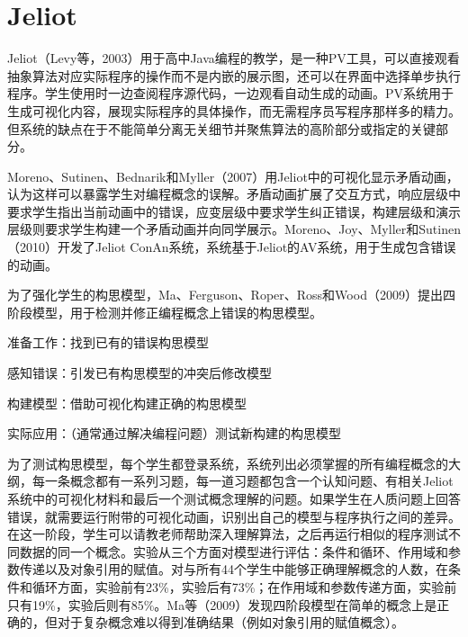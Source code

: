 \section{Jeliot}
\begin{sectext}
Jeliot（Levy等，2003）用于高中Java编程的教学，是一种PV工具，可以直接观看抽象算法对应实际程序的操作而不是内嵌的展示图，还可以在界面中选择单步执行程序。学生使用时一边查阅程序源代码，一边观看自动生成的动画。PV系统用于生成可视化内容，展现实际程序的具体操作，而无需程序员写程序那样多的精力。但系统的缺点在于不能简单分离无关细节并聚焦算法的高阶部分或指定的关键部分。

Moreno、Sutinen、Bednarik和Myller（2007）用Jeliot中的可视化显示矛盾动画，认为这样可以暴露学生对编程概念的误解。矛盾动画扩展了交互方式，响应层级中要求学生指出当前动画中的错误，应变层级中要求学生纠正错误，构建层级和演示层级则要求学生构建一个矛盾动画并向同学展示。Moreno、Joy、Myller和Sutinen（2010）开发了Jeliot ConAn系统，系统基于Jeliot的AV系统，用于生成包含错误的动画。

为了强化学生的构思模型，Ma、Ferguson、Roper、Ross和Wood（2009）提出四阶段模型，用于检测并修正编程概念上错误的构思模型。

\begin{itemlist}
\item 准备工作：找到已有的错误构思模型

\item 感知错误：引发已有构思模型的冲突后修改模型

\item 构建模型：借助可视化构建正确的构思模型

\item 实际应用：（通常通过解决编程问题）测试新构建的构思模型
\end{itemlist}
为了测试构思模型，每个学生都登录系统，系统列出必须掌握的所有编程概念的大纲，每一条概念都有一系列习题，每一道习题都包含一个认知问题、有相关Jeliot系统中的可视化材料和最后一个测试概念理解的问题。如果学生在人质问题上回答错误，就需要运行附带的可视化动画，识别出自己的模型与程序执行之间的差异。在这一阶段，学生可以请教老师帮助深入理解算法，之后再运行相似的程序测试不同数据的同一个概念。实验从三个方面对模型进行评估：条件和循环、作用域和参数传递以及对象引用的赋值。对与所有44个学生中能够正确理解概念的人数，在条件和循环方面，实验前有23\%，实验后有73\%；在作用域和参数传递方面，实验前只有19\%，实验后则有85\%。Ma等（2009）发现四阶段模型在简单的概念上是正确的，但对于复杂概念难以得到准确结果（例如对象引用的赋值概念）。
\end{sectext}
